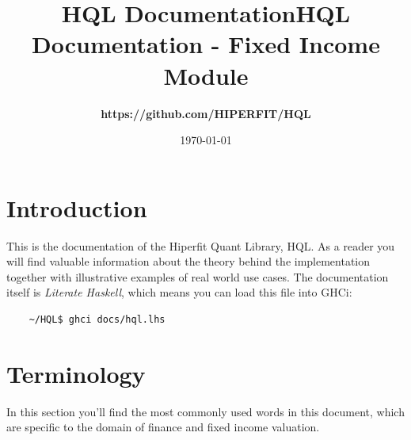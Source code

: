 \documentclass[11pt,a4paper]{article}
\def\Author{
\bf https://github.com/HIPERFIT/HQL
}
\def\Title{\bf HQL Documentation \sf- Fixed Income Module}
\numberwithin{equation}{section}
\begin{document}
\title{HQL Documentation}

\title{\Title}
\author{\Author}
\date{\today}
\maketitle

\tableofcontents

\FrameSep

\newpage


	\section{Introduction}
	This is the documentation of the Hiperfit Quant Library, HQL. As a reader you will
	find valuable information about the theory behind the implementation together with
	illustrative examples of real world use cases. The documentation itself is \textit{Literate Haskell}\cite{LitHaskell},
	which means you can load this file into GHCi:

	\FrameSep
	\begin{lstlisting}
	~/HQL$ ghci docs/hql.lhs
	\end{lstlisting}

	\section{Terminology}
	In this section you'll find the most commonly used words in this document, which are specific to the domain of finance and fixed income valuation.


\end{document}

